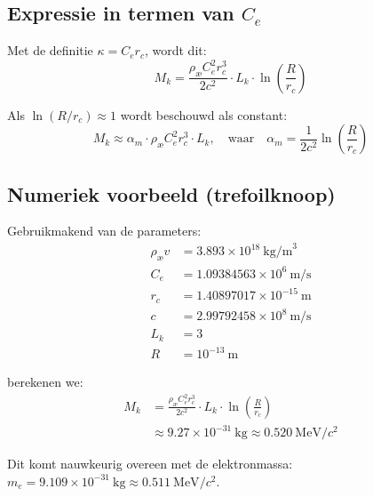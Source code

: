 \subsection{Expressie in termen van \( C_e \)}
Met de definitie \( \kappa = C_e r_c \), wordt dit:
\begin{equation}
    M_k = \frac{\rho_\text{\ae} C_e^2 r_c^3}{2 c^2} \cdot L_k \cdot \ln\left( \frac{R}{r_c} \right)
\end{equation}

Als \( \ln(R/r_c) \approx 1 \) wordt beschouwd als constant:
\begin{equation}
    M_k \approx \alpha_m \cdot \rho_\text{\ae} C_e^2 r_c^3 \cdot L_k, \quad \text{waar} \quad \alpha_m = \frac{1}{2c^2} \ln\left( \frac{R}{r_c} \right)
\end{equation}

\subsection*{Numeriek voorbeeld (trefoilknoop)}
Gebruikmakend van de parameters:
\begin{align*}
    \rho_\text{\ae} v&= 3.893 \times 10^{18}~\text{kg/m}^3 \\
    C_e &= 1.09384563 \times 10^6~\text{m/s} \\
    r_c &= 1.40897017 \times 10^{-15}~\text{m} \\
    c &= 2.99792458 \times 10^8~\text{m/s} \\
    L_k &= 3 \\
    R &= 10^{-13}~\text{m}
\end{align*}

berekenen we:
\begin{align*}
    M_k &= \frac{\rho_\text{\ae} C_e^2 r_c^3}{2 c^2} \cdot L_k \cdot \ln\left( \frac{R}{r_c} \right) \\
    &\approx 9.27 \times 10^{-31}~\text{kg} \approx 0.520~\text{MeV}/c^2
\end{align*}

Dit komt nauwkeurig overeen met de elektronmassa: \( m_e = 9.109 \times 10^{-31}~\text{kg} \approx 0.511~\text{MeV}/c^2 \).